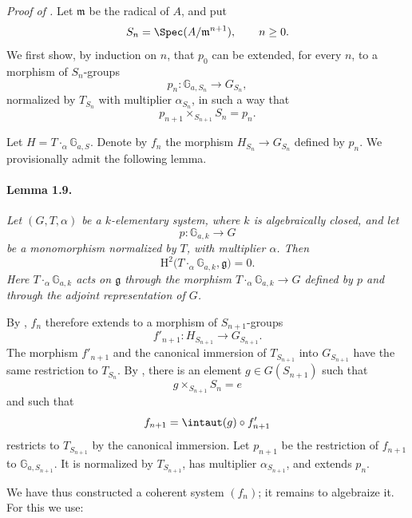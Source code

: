 
\medskip
\noindent\emph{Proof of .}
Let \(\mathfrak m\) be the radical of \(A\), and put
\[
  S_n=\Spec(A/\mathfrak m^{n+1}),\qquad n\geq 0.
\]
We first show, by induction on \(n\), that \(p_0\) can be extended,
for every \(n\), to a morphism of \(S_n\)-groups
\[
  p_n\colon\mathbb G_{a,S_n}\longrightarrow G_{S_n},
\]
normalized by \(T_{S_n}\) with multiplier \(\alpha_{S_n}\), in such
a way that
\[
  p_{n+1}\times_{S_{n+1}}S_n=p_n.
\]

Let \(H=T\mathbin{\cdot_\alpha}\mathbb G_{a,S}\). Denote by \(f_n\)
the morphism \(H_{S_n}\to G_{S_n}\) defined by \(p_n\). We
provisionally admit the following lemma.

\paragraph{\textbf{Lemma 1.9.}}
\emph{Let \((G,T,\alpha)\) be a \(k\)-elementary system, where \(k\)
is algebraically closed, and let
\[
  p\colon\mathbb G_{a,k}\longrightarrow G
\]
be a monomorphism normalized by \(T\), with multiplier \(\alpha\).
Then}
\[
  \mathrm H^2\bigl(T\mathbin{\cdot_\alpha}\mathbb G_{a,k},
    \mathfrak g\bigr)=0.
\]
\emph{Here \(T\mathbin{\cdot_\alpha}\mathbb G_{a,k}\) acts on
\(\mathfrak g\) through the morphism
\(T\mathbin{\cdot_\alpha}\mathbb G_{a,k}\to G\) defined by \(p\)
and through the adjoint representation of \(G\).}

By , \(f_n\) therefore extends to a morphism of
\(S_{n+1}\)-groups
\[
  f'_{n+1}\colon H_{S_{n+1}}\longrightarrow G_{S_{n+1}}.
\]
The morphism \(f'_{n+1}\) and the canonical immersion of
\(T_{S_{n+1}}\) into \(G_{S_{n+1}}\) have the same restriction to
\(T_{S_n}\). By , there is an element
\(g\in G(S_{n+1})\) such that
\[
  g\times_{S_{n+1}}S_n=e
\]
and such that
\[
  f_{n+1}=\intaut(g)\circ f'_{n+1}
\]
restricts to \(T_{S_{n+1}}\) by the canonical immersion. Let
\(p_{n+1}\) be the restriction of \(f_{n+1}\) to
\(\mathbb G_{a,S_{n+1}}\). It is normalized by \(T_{S_{n+1}}\),
has multiplier \(\alpha_{S_{n+1}}\), and extends \(p_n\).

We have thus constructed a coherent system \((f_n)\); it remains to
algebraize it. For this we use:

